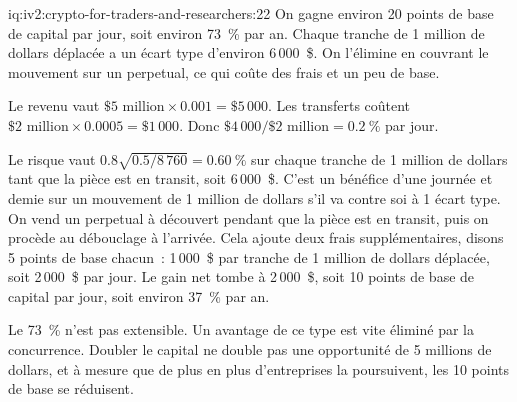 \begin{solution}{iq:iv2:crypto-for-traders-and-researchers:22}
On gagne environ 20 points de base de capital par jour, soit environ 73~\% par an. Chaque tranche de 1 million de dollars déplacée a un écart type d'environ 6\,000~\$. On l'élimine en couvrant le mouvement sur un perpetual, ce qui coûte des frais et un peu de base.

Le revenu vaut $\$5 \text{ million} \times 0.001 = \$5\,000$. Les transferts coûtent $\$2 \text{ million} \times 0.0005 = \$1\,000$. Donc $\$4\,000/\$2 \text{ million} = 0.2~\%$ par jour.

Le risque vaut $0.8\sqrt{0.5/8\,760} = 0.60~\%$ sur chaque tranche de 1 million de dollars tant que la pièce est en transit, soit 6\,000~\$. C'est un bénéfice d'une journée et demie sur un mouvement de 1 million de dollars s'il va contre soi à 1 écart type. On vend un perpetual à découvert pendant que la pièce est en transit, puis on procède au débouclage à l'arrivée. Cela ajoute deux frais supplémentaires, disons 5 points de base chacun~: 1\,000~\$ par tranche de 1 million de dollars déplacée, soit 2\,000~\$ par jour. Le gain net tombe à 2\,000~\$, soit 10 points de base de capital par jour, soit environ 37~\% par an.

Le 73~\% n'est pas extensible. Un avantage de ce type est vite éliminé par la concurrence. Doubler le capital ne double pas une opportunité de 5 millions de dollars, et à mesure que de plus en plus d'entreprises la poursuivent, les 10 points de base se réduisent.

\end{solution}

